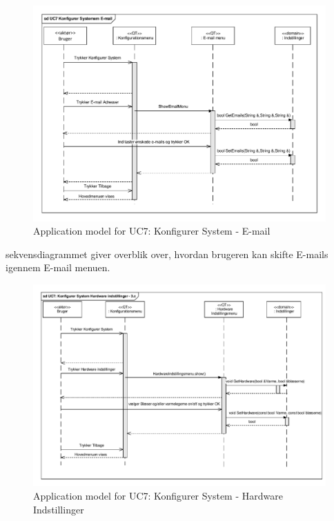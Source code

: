 \begin{figure}[!h]
\centering 
\includegraphics[width={\textwidth}, trim=0 0 0 0, clip=true] {../fig/SD_autoGreen_UC_7_E_mail.pdf}
\caption{Application model for UC7: Konfigurer System - E-mail}
\label{fig:SD_UC7}
\end{figure}

sekvensdiagrammet giver overblik over, hvordan brugeren kan skifte E-mails igennem E-mail menuen.

\clearpage

\begin{figure}[!h]
\centering 
\includegraphics[width={\textwidth}, trim=0 0 0 0, clip=true] {../fig/SD_autoGreen_UC_7_Hardware_indstillinger.pdf}
\caption{Application model for UC7: Konfigurer System - Hardware Indstillinger}
\label{fig:SD_UC7_alt1}
\end{figure}

